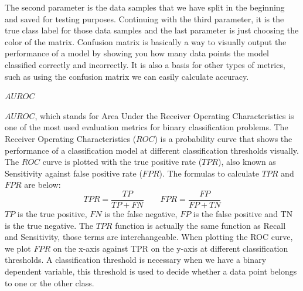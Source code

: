 \documentclass[a4paper,12pt]{report}
\newcommand{\msection}[1]{\noindent\textbf{#1}}
\begin{document}
The second parameter is the data samples that we have split in the beginning and saved for testing purposes. Continuing with the third parameter, it is the true class label for those data samples and the last parameter is just choosing the color of the matrix. Confusion matrix is basically a way to visually output the performance of a model by showing you how many data points the model classified correctly and incorrectly. It is also a basis for other types of metrics, such as using the confusion matrix we can easily calculate accuracy.

\msection{$AUROC$}

$AUROC$, which stands for Area Under the Receiver Operating Characteristics is one of the most used evaluation metrics for binary classification problems. The Receiver Operating Characteristics ($ROC$) is a probability curve that shows the performance of a classification model at different classification thresholds visually. The $ROC$ curve is plotted with the true positive rate ($TPR$), also known as Sensitivity against false positive rate ($FPR$). The formulas to calculate $TPR$ and $FPR$ are below:
$$TPR=\frac{TP}{TP+FN}\qquad FPR=\frac{FP}{FP+TN}$$
$TP$ is the true positive, $FN$ is the false negative, $FP$ is the false positive and TN is the true negative. The $TPR$ function is actually the same function as Recall and Sensitivity, those terms are interchangeable. When plotting the ROC curve, we plot $FPR$ on the x-axis against TPR on the y-axis at different classification thresholds. A classification threshold is necessary when we have a binary dependent variable, this threshold is used to decide whether a data point belongs to one or the other class.
\end{document}
